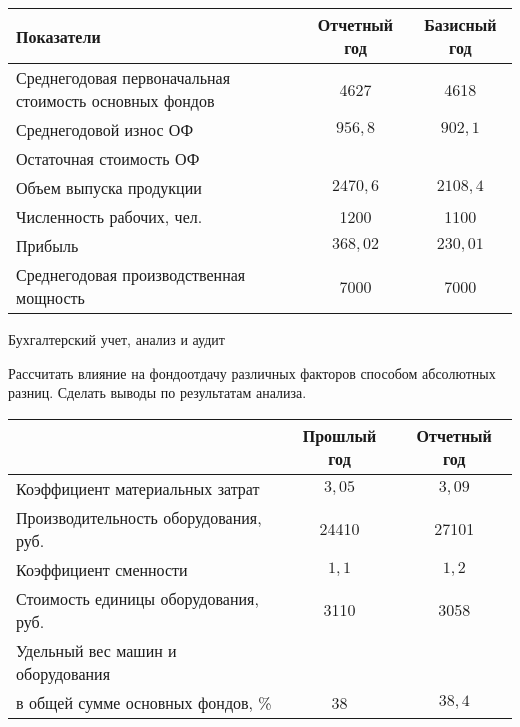 \documentclass[
	11pt,
	a4paper,
	]
	{article}
\begin{document}
\begin{table}[ht!]\centering
\begin{tabular}{|l|c|c|}
\hline
\hfil Показатели & Отчетный год & Базисный год \\ \hline
Среднегодовая первоначальная стоимость основных фондов & 4627 & 4618 \\ \hline
Среднегодовой износ ОФ & $956{,}8$ &  $902{,}1$ \\ \hline
Остаточная стоимость ОФ & & \\ \hline
Объем выпуска продукции & $2470{,}6$ & $2108{,}4$ \\ \hline
Численность рабочих, чел. & 1200 & 1100 \\ \hline
Прибыль & $368{,}02$ &  $230{,}01$ \\ \hline
Среднегодовая производственная мощность & 7000 & 7000 \\ \hline
\end{tabular}
\end{table}

\begin{center}\lowGE * \end{center}
\newpage




 {Бухгалтерский учет, анализ и аудит}
\prGE

	Рассчитать влияние на фондоотдачу различных факторов способом абсолютных разниц. Сделать выводы по результатам анализа.

\begin{table}[ht!]\centering
\begin{tabular}{|l|c|c|}
\hline
& Прошлый год & Отчетный год \\ \hline
Коэффициент материальных затрат & $3{,}05$ & $3{,}09$ \\ \hline
Производительность оборудования, руб. & 24410 & 27101 \\ \hline
Коэффициент сменности & $1{,}1$ & $1{,}2$ \\ \hline
Стоимость единицы оборудования, руб. & 3110 & 3058 \\ \hline
Удельный вес машин и оборудования & & \\
в общей сумме основных фондов, \% & 38 & $38{,}4$
\\ \hline
\end{tabular}
\end{table}

\begin{center}\lowGE * \end{center}
\newpage
\end{document}
